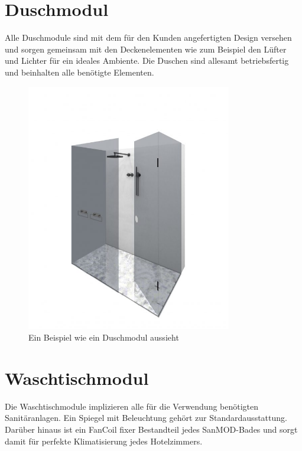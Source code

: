 \section*{Duschmodul}
Alle Duschmodule sind mit dem für den Kunden angefertigten Design versehen und sorgen gemeinsam mit den Deckenelementen wie zum Beispiel den Lüfter und Lichter für ein ideales Ambiente. Die Duschen sind allesamt betriebsfertig und beinhalten alle benötigte Elementen.

\begin{figure}[h]
    \centering
    \includegraphics[width=0.8\textwidth]{images/Modul-Dusche-600x727.jpg}
    \caption{Ein Beispiel wie ein Duschmodul aussieht \cite{SanMOD}}
    \label{}
\end{figure}
    
\clearpage
\newpage
\section*{Waschtischmodul}\label{sec:waschtischmodul}
Die Waschtischmodule implizieren alle für die Verwendung benötigten Sanitäranlagen. Ein Spiegel mit Beleuchtung gehört zur Standardausstattung. Darüber hinaus ist ein FanCoil fixer Bestandteil jedes SanMOD-Bades und sorgt damit für perfekte Klimatisierung jedes Hotelzimmers.

